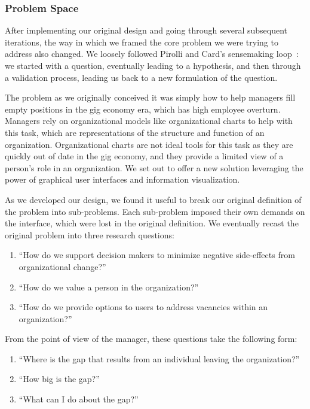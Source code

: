 \documentclass[journal]{vgtc}                %
\begin{document}
\subsubsection{Problem Space}
\label{sec:problem}
After implementing our original design and going through several subsequent iterations, the way in which we framed the core problem we were trying to address also changed. We loosely followed Pirolli and Card's sensemaking loop~\cite{pirolli2005sensemaking}: we started with a question, eventually leading to a hypothesis, and then through a validation process, leading us back to a new formulation of the question.  

The problem as we originally conceived it was simply how to help managers fill empty positions in the gig economy era, which has high employee overturn. Managers rely on organizational models like organizational charts to help with this task, which are representations of the structure and function of an organization. Organizational charts are not ideal tools for this task as they are quickly out of date in the gig economy, and they provide a limited view of a person's role in an organization. We set out to offer a new solution leveraging the power of graphical user interfaces and information visualization. 

As we developed our design, we found it useful to break our original definition of the problem into sub-problems. Each sub-problem imposed their own demands on the interface, which were lost in the original definition. We eventually recast the original problem into three research questions: 

\begin{enumerate}
\item “How do we support decision makers to minimize negative side-effects from organizational change?”
\item “How do we value a person in the organization?”
\item “How do we provide options to users to address vacancies within an organization?”
\end{enumerate}

From the point of view of the manager, these questions take the following form: 

\begin{enumerate}
\item ``Where is the gap that results from an individual leaving the organization?''
\item ``How big is the gap?''
\item ``What can I do about the gap?''
\end{enumerate}
\end{document}
